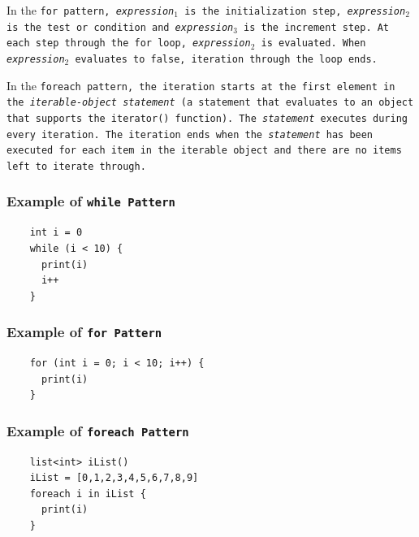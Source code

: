 \documentclass{article}
\begin{document}
In the \tt for \rm pattern, \emph{expression}$_1$ is the initialization step,
\emph{expression}$_2$ is the test or condition and \emph{expression}$_3$ is the
increment step. At each step through the for loop, \emph{expression}$_2$ is
evaluated. When \emph{expression}$_2$ evaluates to false, iteration through the
loop ends.

In the \tt foreach \rm pattern, the iteration starts at the first element in the
\emph{iterable-object statement} (a statement that evaluates to an object that
supports the \tt iterator() \rm function). The \emph{statement} executes during
every iteration. The iteration ends when the \emph{statement} has been executed
for each item in the iterable object and there are no items left to iterate
through.

\subsubsection{Example of \tt while \rm \textbf{Pattern}} %
\label{ssub:example_1}

\begin{verbatim}
    int i = 0
    while (i < 10) {
      print(i)
      i++
    }
\end{verbatim}


\subsubsection{Example of \tt for \rm \textbf{Pattern}} %
\label{ssub:example_2}

\begin{verbatim}
    for (int i = 0; i < 10; i++) {
      print(i)
    }
\end{verbatim}


\subsubsection{Example of \tt foreach \rm \textbf{Pattern}} %
\label{ssub:example_3}

\begin{verbatim}
    list<int> iList()
    iList = [0,1,2,3,4,5,6,7,8,9]
    foreach i in iList {
      print(i)
    }
\end{verbatim}


\end{document}
